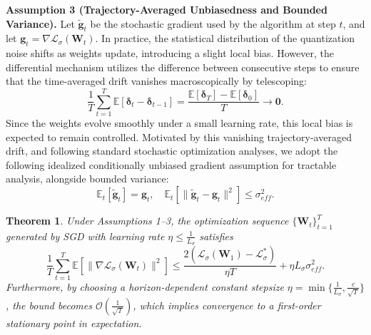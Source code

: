 \documentclass{article}
\newtheorem{theorem}{Theorem}
\begin{document}
\textbf{Assumption 3 (Trajectory-Averaged Unbiasedness and Bounded Variance).}
Let $\tilde{\boldsymbol{g}}_t$ be the stochastic gradient used by the algorithm at step $t$, and let $\boldsymbol{g}_t=\nabla \mathcal{L}_\sigma(\boldsymbol{W}_t)$. In practice, the statistical distribution of the quantization noise shifts as weights update, introducing a slight local bias. However, the differential mechanism utilizes the difference between consecutive steps to ensure that the time-averaged drift vanishes macroscopically by telescoping:
\begin{equation}
    \frac{1}{T}\sum_{t=1}^{T}\mathbb{E}[\boldsymbol{\delta}_{t}-\boldsymbol{\delta}_{t-1}]
    =\frac{\mathbb{E}[\boldsymbol{\delta}_{T}]-\mathbb{E}[\boldsymbol{\delta}_{0}]}{T}
    \rightarrow \mathbf{0}.
\end{equation}
Since the weights evolve smoothly under a small learning rate, this local bias is expected to remain controlled. Motivated by this vanishing trajectory-averaged drift, and following standard stochastic optimization analyses, we adopt the following idealized conditionally unbiased gradient assumption for tractable analysis, alongside bounded variance:
\begin{equation}
    \mathbb{E}_t[\tilde{\boldsymbol{g}}_t] = \boldsymbol{g}_t, \quad \mathbb{E}_t\left[\|\tilde{\boldsymbol{g}}_t-\boldsymbol{g}_t\|^2\right]\leq \sigma_{eff}^2.
\end{equation}

\begin{theorem}
\textit{Under Assumptions 1--3, the optimization sequence $\{\boldsymbol{W}_t\}_{t=1}^T$ generated by SGD with learning rate $\eta \leq \frac{1}{L_\sigma}$ satisfies}
\begin{equation}
    \frac{1}{T} \sum_{t=1}^{T} \mathbb{E}\left[\|\nabla \mathcal{L}_\sigma(\boldsymbol{W}_t)\|^2\right] \leq \frac{2(\mathcal{L}_\sigma(\boldsymbol{W}_1) - \mathcal{L}_\sigma^*)}{\eta T} + \eta L_\sigma \sigma_{eff}^2.
\end{equation}
\textit{Furthermore, by choosing a horizon-dependent constant stepsize $\eta = \min\{\frac{1}{L_\sigma}, \frac{c}{\sqrt{T}}\}$, the bound becomes $\mathcal{O}(\frac{1}{\sqrt{T}})$, which implies convergence to a first-order stationary point in expectation.}
\end{theorem}
\end{document}
